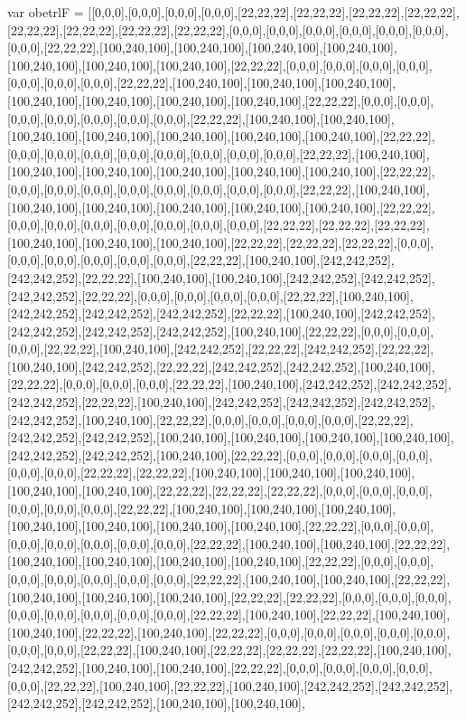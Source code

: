 var obetrlF = [[0,0,0],[0,0,0],[0,0,0],[0,0,0],[22,22,22],[22,22,22],[22,22,22],[22,22,22],[22,22,22],[22,22,22],[22,22,22],[22,22,22],[0,0,0],[0,0,0],[0,0,0],[0,0,0],[0,0,0],[0,0,0],[0,0,0],[22,22,22],[100,240,100],[100,240,100],[100,240,100],[100,240,100],[100,240,100],[100,240,100],[100,240,100],[22,22,22],[0,0,0],[0,0,0],[0,0,0],[0,0,0],[0,0,0],[0,0,0],[0,0,0],[22,22,22],[100,240,100],[100,240,100],[100,240,100],[100,240,100],[100,240,100],[100,240,100],[100,240,100],[22,22,22],[0,0,0],[0,0,0],[0,0,0],[0,0,0],[0,0,0],[0,0,0],[0,0,0],[22,22,22],[100,240,100],[100,240,100],[100,240,100],[100,240,100],[100,240,100],[100,240,100],[100,240,100],[22,22,22],[0,0,0],[0,0,0],[0,0,0],[0,0,0],[0,0,0],[0,0,0],[0,0,0],[0,0,0],[22,22,22],[100,240,100],[100,240,100],[100,240,100],[100,240,100],[100,240,100],[100,240,100],[22,22,22],[0,0,0],[0,0,0],[0,0,0],[0,0,0],[0,0,0],[0,0,0],[0,0,0],[0,0,0],[22,22,22],[100,240,100],[100,240,100],[100,240,100],[100,240,100],[100,240,100],[100,240,100],[22,22,22],[0,0,0],[0,0,0],[0,0,0],[0,0,0],[0,0,0],[0,0,0],[0,0,0],[22,22,22],[22,22,22],[22,22,22],[100,240,100],[100,240,100],[100,240,100],[22,22,22],[22,22,22],[22,22,22],[0,0,0],[0,0,0],[0,0,0],[0,0,0],[0,0,0],[0,0,0],[22,22,22],[100,240,100],[242,242,252],[242,242,252],[22,22,22],[100,240,100],[100,240,100],[242,242,252],[242,242,252],[242,242,252],[22,22,22],[0,0,0],[0,0,0],[0,0,0],[0,0,0],[22,22,22],[100,240,100],[242,242,252],[242,242,252],[242,242,252],[22,22,22],[100,240,100],[242,242,252],[242,242,252],[242,242,252],[242,242,252],[100,240,100],[22,22,22],[0,0,0],[0,0,0],[0,0,0],[22,22,22],[100,240,100],[242,242,252],[22,22,22],[242,242,252],[22,22,22],[100,240,100],[242,242,252],[22,22,22],[242,242,252],[242,242,252],[100,240,100],[22,22,22],[0,0,0],[0,0,0],[0,0,0],[22,22,22],[100,240,100],[242,242,252],[242,242,252],[242,242,252],[22,22,22],[100,240,100],[242,242,252],[242,242,252],[242,242,252],[242,242,252],[100,240,100],[22,22,22],[0,0,0],[0,0,0],[0,0,0],[0,0,0],[22,22,22],[242,242,252],[242,242,252],[100,240,100],[100,240,100],[100,240,100],[100,240,100],[242,242,252],[242,242,252],[100,240,100],[22,22,22],[0,0,0],[0,0,0],[0,0,0],[0,0,0],[0,0,0],[0,0,0],[22,22,22],[22,22,22],[100,240,100],[100,240,100],[100,240,100],[100,240,100],[100,240,100],[22,22,22],[22,22,22],[22,22,22],[0,0,0],[0,0,0],[0,0,0],[0,0,0],[0,0,0],[0,0,0],[22,22,22],[100,240,100],[100,240,100],[100,240,100],[100,240,100],[100,240,100],[100,240,100],[100,240,100],[22,22,22],[0,0,0],[0,0,0],[0,0,0],[0,0,0],[0,0,0],[0,0,0],[0,0,0],[22,22,22],[100,240,100],[100,240,100],[22,22,22],[100,240,100],[100,240,100],[100,240,100],[100,240,100],[22,22,22],[0,0,0],[0,0,0],[0,0,0],[0,0,0],[0,0,0],[0,0,0],[0,0,0],[22,22,22],[100,240,100],[100,240,100],[22,22,22],[100,240,100],[100,240,100],[100,240,100],[22,22,22],[22,22,22],[0,0,0],[0,0,0],[0,0,0],[0,0,0],[0,0,0],[0,0,0],[0,0,0],[0,0,0],[22,22,22],[100,240,100],[22,22,22],[100,240,100],[100,240,100],[22,22,22],[100,240,100],[22,22,22],[0,0,0],[0,0,0],[0,0,0],[0,0,0],[0,0,0],[0,0,0],[0,0,0],[22,22,22],[100,240,100],[22,22,22],[22,22,22],[22,22,22],[100,240,100],[242,242,252],[100,240,100],[100,240,100],[22,22,22],[0,0,0],[0,0,0],[0,0,0],[0,0,0],[0,0,0],[22,22,22],[100,240,100],[22,22,22],[100,240,100],[242,242,252],[242,242,252],[242,242,252],[242,242,252],[100,240,100],[100,240,100],